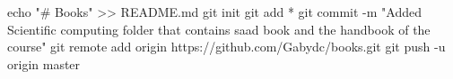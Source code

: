 echo "# Books" >> README.md
git init
git add *
git commit -m "Added Scientific computing folder that contains saad book and the handbook of the course"
git remote add origin https://github.com/Gabydc/books.git
git push -u origin master
